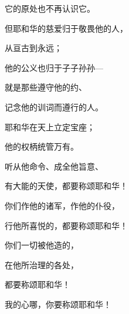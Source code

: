 {\par }{\Q 它的原处也不再认识它。
\par }{\Q {}但耶和华的慈爱归于敬畏他的人，
\par }{\Q 从亘古到永远；
\par }{\Q 他的公义也归于子子孙孙—
\par }{\Q {}就是那些遵守他的约、
\par }{\Q 记念他的训词而遵行的人。
\par }{\BB \par }{\Q {}耶和华在天上立定宝座；
\par }{\Q 他的权柄统管万有。
\par }{\Q {}听从他命令、成全他旨意、
\par }{\Q 有大能的天使，都要称颂耶和华！
\par }{\Q {}你们作他的诸军，作他的仆役，
\par }{\Q 行他所喜悦的，都要称颂耶和华！
\par }{\Q {}你们一切被他造的，
\par }{\Q 在他所治理的各处，
\par }{\Q 都要称颂耶和华！
\par }{\BB \par }{\Q 我的心哪，你要称颂耶和华！

}
